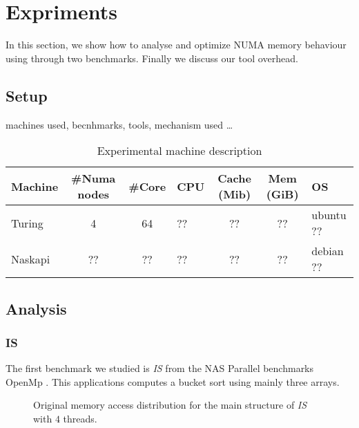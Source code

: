 \section{Expriments}
\label{sec:expe}
In this section, we show how to analyse and optimize NUMA memory behaviour using
\TABARNAC through two benchmarks. Finally we discuss our tool overhead.
\subsection{Setup}
\label{sec:expe-setup}
machines used, becnhmarks, tools, mechanism used \ldots

\begin{table}
    \centering
    \resizebox{\linewidth}{!}
    {
        \begin{tabular}{l|c|c|l|c|c|l}
            Machine & \#Numa nodes & \#Core & CPU & Cache (Mib) & Mem (GiB) & OS\\
            \hline
            Turing & 4 & 64 & ?? & ?? & ?? &  ubuntu ??\\
            \hline
            Naskapi & ?? &?? &?? &?? & ?? &debian ??\\
        \end{tabular}
    }
    \caption{Experimental machine description}
    \label{tab:machines}
\end{table}

\subsection{Analysis}
\label{sec:expe-analysis}

\subsubsection{IS}
The first benchmark we studied is \emph{IS} from the  NAS Parallel benchmarks OpenMp
\cite{Feng04Unstructured}. This applications computes a bucket sort using
mainly three arrays.

\begin{figure}[htb]
    \centering


    \caption{Original memory access distribution for the main structure of
        \emph{IS} with $4$ threads.}
    \label{fig:is-behaviour-orig}
\end{figure}

